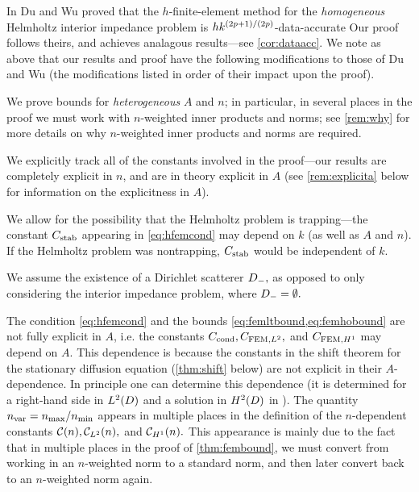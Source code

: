 In \cite{DuWu:15} Du and Wu proved that the $h$-finite-element method for the \emph{homogeneous} Helmholtz interior impedance problem is $hk^{(2p+1)/(2p)}$-data-accurate  Our proof follows theirs, and achieves analagous results---see \cref{cor:dataacc}. We note as above that our results and proof have the following modifications to those of Du and Wu (the modifications listed in order of their impact upon the proof).
\ben
\item We prove bounds for \emph{heterogeneous} $A$ and $n$; in particular, in several places in the proof we must work with $n$-weighted inner products and norms; see \cref{rem:why} for more details on why $n$-weighted inner products and norms are required.
\item We explicitly track all of the constants involved in the proof---our results are completely explicit in $n$, and are in theory explicit in $A$ (see \cref{rem:explicita} below for information on the explicitness in $A$).
\item We allow for the possibility that the Helmholtz problem is trapping---the constant $C_{\mathrm{stab}}$ appearing in \cref{eq:hfemcond} may depend on $k$ (as well as $A$ and $n$). If the Helmholtz problem was nontrapping, $C_{\mathrm{stab}}$ would be independent of $k$.
  \item We assume the existence of a Dirichlet scatterer $D_{-},$ as opposed to only considering the interior impedance problem, where $D_{-}=\emptyset.$
\een
\ere

\label{rem:explicita}
The condition \cref{eq:hfemcond} and the bounds \cref{eq:femltbound,eq:femhobound} are not fully explicit in $A$, i.e. the constants $C_{\mathrm{cond}}, C_{\mathrm{FEM},L^{2}},$ and $C_{\mathrm{FEM},H^{1}}$ may depend on $A$. This dependence is because the constants in the shift theorem for the stationary diffusion equation (\cref{thm:shift} below) are not explicit in their $A$-dependence. In principle one can determine this dependence (it is determined for a right-hand side in $\LtD$ and a solution in $\HtD$ in \cite[Appendix A]{ChScTe:13}).
\ere
{}\label{rem:nvar}
The quantity $n_{\mathrm{var}} = n_{\max}/n_{\min}$ appears in multiple places in the definition of the $n$-dependent constants $\mathcal C(n), \mathcal C_{L^{2}}(n),$ and $\mathcal C_{H^{1}}(n).$ This appearance is mainly due to the fact that in multiple places in the proof of \cref{thm:fembound}, we must convert from working in an $n$-weighted norm to a standard norm, and then later convert back to an $n$-weighted norm again.

